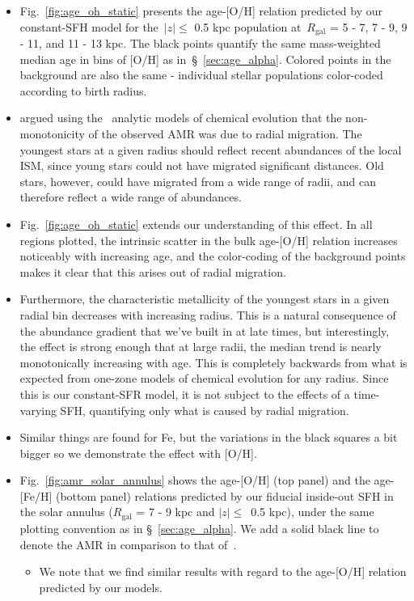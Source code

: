\documentclass[fleqn, usenatbib]{mnras}
\begin{document}
\begin{itemize} 
	\item Fig.~\ref{fig:age_oh_static} presents the age-[O/H] relation 
	predicted by our constant-SFH model for the~$\left|z\right|\leq$ 0.5 kpc 
	population at~$R_\text{gal}$ = 5 - 7, 7 - 9, 9 - 11, and 11 - 13 kpc. The 
	black points quantify the same mass-weighted median age in bins of 
	[O/H] as in~\S~\ref{sec:age_alpha}. Colored points in the background are 
	also the same - individual stellar populations color-coded according to 
	birth radius. 

	\item \citet{Feuillet2019} argued using the~\citet{Weinberg2017} analytic 
	models of chemical evolution that the non-monotonicity of the observed 
	AMR was due to radial migration. The youngest stars at a given radius 
	should reflect recent abundances of the local ISM, since young stars could 
	not have migrated significant distances. Old stars, however, could have 
	migrated from a wide range of radii, and can therefore reflect a wide 
	range of abundances. 

	\item Fig.~\ref{fig:age_oh_static} extends our understanding of this 
	effect. In all regions plotted, the intrinsic scatter in the bulk 
	age-[O/H] relation increases noticeably with increasing age, and the 
	color-coding of the background points makes it clear that this arises out 
	of radial migration. 

	\item Furthermore, the characteristic metallicity of the youngest stars 
	in a given radial bin decreases with increasing radius. This is a natural 
	consequence of the abundance gradient that we've built in at late times, 
	but interestingly, the effect is strong enough that at large radii, the 
	median trend is nearly monotonically increasing with age. This is 
	completely backwards from what is expected from one-zone models of 
	chemical evolution for any radius. Since this is our constant-SFR model, 
	it is not subject to the effects of a time-varying SFH, quantifying only 
	what is caused by radial migration. 

	\item Similar things are found for Fe, but the variations in the black 
	squares a bit bigger so we demonstrate the effect with [O/H]. 

	\item Fig.~\ref{fig:amr_solar_annulus} shows the age-[O/H] (top panel) 
	and the age-[Fe/H] (bottom panel) relations predicted by our fiducial 
	inside-out SFH in the solar annulus ($R_\text{gal}$ = 7 - 9 kpc and 
	$\left|z\right|\leq$~0.5 kpc), under the same plotting convention as in 
	\S~\ref{sec:age_alpha}. We add a solid black line to denote the 
	\citet{Feuillet2018} AMR in comparison to that of~\citet{Feuillet2019}. 
	\begin{itemize} 
		\item We note that we find similar results with regard to the 
		age-[O/H] relation predicted by our models. 


\end{itemize}
\end{itemize}
\end{document}
